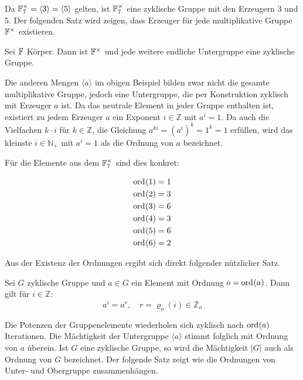 Da $\field{7}^\times = \langle 3 \rangle = \langle 5 \rangle$ gelten, ist $\field{7}^\times$ eine zyklische Gruppe mit den Erzeugern $3$ und $5$. Der folgenden Satz wird zeigen, dass Erzeuger für jede multiplikative Gruppe $\field{}^\times$ existieren.

\begin{satz}
    Sei $\field{}$ Körper. Dann ist $\field{}^\times$ und jede weitere endliche Untergruppe eine zyklische Gruppe. 
\end{satz}

Die anderen Mengen $\langle a \rangle$ im obigen Beispiel bilden zwar nicht die gesamte multiplikative Gruppe, jedoch eine Untergruppe, die per Konstruktion zyklisch mit Erzeuger $a$ ist. Da das neutrale Element in jeder Gruppe enthalten ist, existiert zu jedem Erzeuger $a$ ein Exponent $i \in \mathbb{Z}$ mit $a^i = 1$. Da auch die Vielfachen $k\cdot i$ für $k\in \mathbb{Z}$, die Gleichung $a^{ki} = {(a^i)}^k = 1^k = 1$ erfüllen, wird das kleinste $i \in \mathbb{N}_+$ mit $a^i = 1$ als die Ordnung von $a$ bezeichnet.

Für die Elemente aus dem $\field{7}^\times$ sind dies konkret:

\begin{align*}
    \ord{1} &= 1 \\
    \ord{2} &= 3 \\
    \ord{3} &= 6 \\
    \ord{4} &= 3 \\
    \ord{5} &= 6 \\
    \ord{6} &= 2
\end{align*}

Aus der Existenz der Ordnungen ergibt sich direkt folgender nützlicher Satz.

\begin{satz}
    Sei $G$ zyklische Gruppe und $a \in G$ ein Element mit Ordnung $o = \ord{a}$. Dann gilt für $i \in \mathbb{Z}$:
    \begin{equation*}
        a^i = a^r, \quad r = \varrho_o(i) \in \mathbb{Z}_o
    \end{equation*}
\end{satz}

Die Potenzen der Gruppenelemente wiederholen sich zyklisch nach $\ord{a}$ Iterationen. Die Mächtigkeit der Untergruppe $\langle a \rangle$ stimmt folglich mit Ordnung von $a$ überein. Ist $G$ eine zyklische Gruppe, so wird die Mächtigkeit $|G|$ auch als Ordnung von $G$ bezeichnet.
Der folgende Satz zeigt wie die Ordnungen von Unter- und Obergruppe zusammenhängen.

